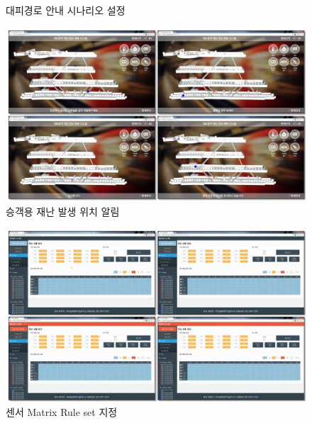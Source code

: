 \documentclass[10pt,a4paper,ragged2e]{altacv}
\begin{document}
\begin{fullwidth}
\begin{itemize}
\begin{itemize}
\begin{figure}[ht!]
\begin{fullwidth}
      \caption*{대피경로 안내 시나리오 설정}
      \end{fullwidth}
    \end{figure}
    \begin{figure}[ht!]
      \begin{fullwidth}
        \centering
        \includegraphics[width=1.2\textwidth]{images/m2m_04.png}
        \caption*{승객용 재난 발생 위치 알림}
      \end{fullwidth}
    \end{figure}
    \begin{figure}[ht!]
      \begin{fullwidth}
        \centering
        \includegraphics[width=1.2\textwidth]{images/m2m_05.png}
        \caption*{센서 Matrix Rule set 지정}
      \end{fullwidth}
    \end{figure}
  \end{itemize}


\end{itemize}
\end{fullwidth}
\end{document}
